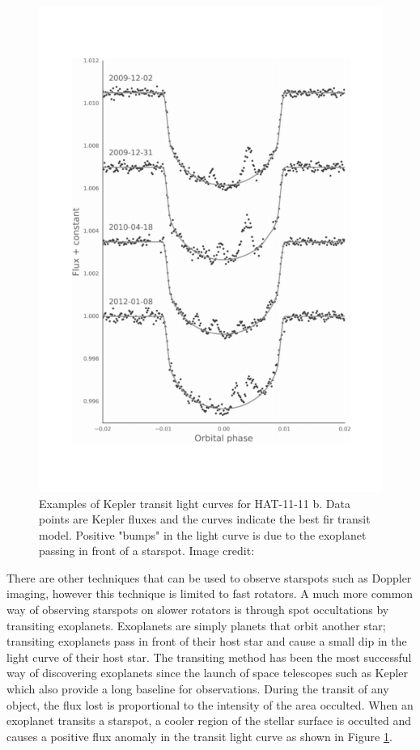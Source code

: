 \begin{figure}
    \centering
    \includegraphics[scale=0.3]{Figures/1-Introduction/hatp_11_spots.pdf}
    \caption[Light curves with examples of starspot "bumps" in exoplanet transits]{Examples of Kepler transit light curves for HAT-11-11 b. Data points are Kepler fluxes and the curves indicate the best fir transit model. Positive "bumps" in the light curve is due to the exoplanet passing in front of a starspot. Image credit: \citet{Morris_etal_2017}}
    \label{fig:spot_occultation_example}
\end{figure}

There are other techniques that can be used to observe starspots such as Doppler imaging, however this technique is limited to fast rotators. A much more common way of observing starspots on slower rotators is through spot occultations by transiting exoplanets. Exoplanets are simply planets that orbit another star; transiting exoplanets pass in front of their host star and cause a small dip in the light curve of their host star. The transiting method has been the most successful way of discovering exoplanets since the launch of space telescopes such as Kepler which also provide a long baseline for observations. During the transit of any object, the flux lost is proportional to the intensity of the area occulted. When an exoplanet transits a starspot, a cooler region of the stellar surface is occulted and causes a positive flux anomaly in the transit light curve as shown in Figure \ref{fig:spot_occultation_example}.

